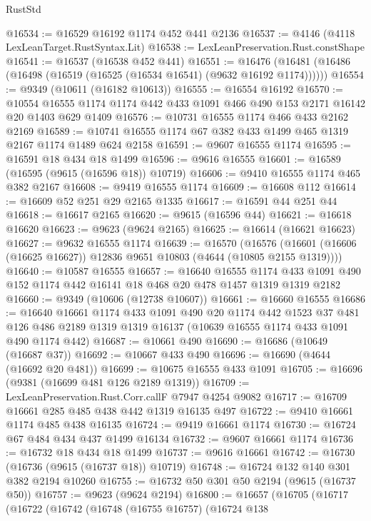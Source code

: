 \begin{lexlean}{RustStd}
\begin{coremodule}
@16534 := @16529 @16192 @1174 @452 @441 @2136
@16537 := @4146 (@4118 LexLeanTarget.RustSyntax.Lit)
@16538 := LexLeanPreservation.Rust.constShape
@16541 := @16537 (@16538 @452 @441)
@16551 := @16476 (@16481 (@16486 (@16498 (@16519 (@16525 (@16534 @16541) (@9632 @16192 @1174))))))
@16554 := @9349 (@10611 (@16182 @10613))
@16555 := @16554 @16192
@16570 := @10554 @16555 @1174 @1174 @442 @433 @1091 @466 @490 @153 @2171 @16142 @20 @1403 @629 @1409
@16576 := @10731 @16555 @1174 @466 @433 @2162 @2169
@16589 := @10741 @16555 @1174 @67 @382 @433 @1499 @465 @1319 @2167 @1174 @1489 @624 @2158
@16591 := @9607 @16555 @1174
@16595 := @16591 @18 @434 @18 @1499
@16596 := @9616 @16555
@16601 := @16589 (@16595 (@9615 (@16596 @18)) @10719)
@16606 := @9410 @16555 @1174 @465 @382 @2167
@16608 := @9419 @16555 @1174
@16609 := @16608 @112
@16614 := @16609 @52 @251 @29 @2165 @1335
@16617 := @16591 @44 @251 @44
@16618 := @16617 @2165
@16620 := @9615 (@16596 @44)
@16621 := @16618 @16620
@16623 := @9623 (@9624 @2165)
@16625 := @16614 (@16621 @16623)
@16627 := @9632 @16555 @1174
@16639 := @16570
    (@16576 (@16601 (@16606 (@16625 @16627)) @12836 @9651 @10803 (@4644 (@10805 @2155 @1319))))
@16640 := @10587 @16555
@16657 := @16640
    @16555
    @1174
    @433
    @1091
    @490
    @152
    @1174
    @442
    @16141
    @18
    @468
    @20
    @478
    @1457
    @1319
    @1319
    @2182
@16660 := @9349 (@10606 (@12738 @10607))
@16661 := @16660 @16555
@16686 := @16640
    @16661
    @1174
    @433
    @1091
    @490
    @20
    @1174
    @442
    @1523
    @37
    @481
    @126
    @486
    @2189
    @1319
    @1319
    @16137
    (@10639 @16555 @1174 @433 @1091 @490 @1174 @442)
@16687 := @10661 @490
@16690 := @16686 (@10649 (@16687 @37))
@16692 := @10667 @433 @490
@16696 := @16690 (@4644 (@16692 @20 @481))
@16699 := @10675 @16555 @433 @1091
@16705 := @16696 (@9381 (@16699 @481 @126 @2189 @1319))
@16709 := LexLeanPreservation.Rust.Corr.callF @7947 @4254 @9082
@16717 := @16709 @16661 @285 @485 @438 @442 @1319 @16135 @497
@16722 := @9410 @16661 @1174 @485 @438 @16135
@16724 := @9419 @16661 @1174
@16730 := @16724 @67 @484 @434 @437 @1499 @16134
@16732 := @9607 @16661 @1174
@16736 := @16732 @18 @434 @18 @1499
@16737 := @9616 @16661
@16742 := @16730 (@16736 (@9615 (@16737 @18)) @10719)
@16748 := @16724 @132 @140 @301 @382 @2194 @10260
@16755 := @16732 @50 @301 @50 @2194 (@9615 (@16737 @50))
@16757 := @9623 (@9624 @2194)
@16800 := @16657
    (@16705
      (@16717
        (@16722
          (@16742
            (@16748
              (@16755 @16757)
              (@16724
                @138

\end{coremodule}
\end{lexlean}
